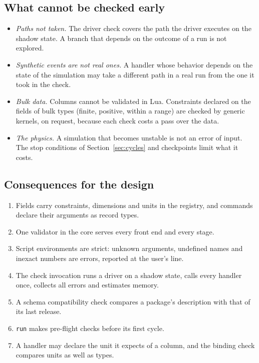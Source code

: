 \documentclass[11pt,a4paper]{article}
\newcommand{\code}[1]{\texttt{#1}}
\begin{document}
\subsection{What cannot be checked early}

\begin{itemize}
  \item \emph{Paths not taken.}  The driver check covers the path the driver
        executes on the shadow state.  A branch that depends on the outcome
        of a run is not explored.
  \item \emph{Synthetic events are not real ones.}  A handler whose
        behavior depends on the state of the simulation may take a
        different path in a real run from the one it took in the check.
  \item \emph{Bulk data.}  Columns cannot be validated in Lua.  Constraints
        declared on the fields of bulk types (finite, positive, within a
        range) are checked by generic kernels, on request, because each
        check costs a pass over the data.
  \item \emph{The physics.}  A simulation that becomes unstable is not an
        error of input.  The stop conditions of Section~\ref{sec:cycles} and
        checkpoints limit what it costs.
\end{itemize}

\subsection{Consequences for the design}

\begin{enumerate}
  \item Fields carry constraints, dimensions and units in the registry, and
        commands declare their arguments as record types.
  \item One validator in the core serves every front end and every stage.
  \item Script environments are strict: unknown arguments, undefined names
        and inexact numbers are errors, reported at the user's line.
  \item The check invocation runs a driver on a shadow state, calls every
        handler once, collects all errors and estimates memory.
  \item A schema compatibility check compares a package's description with
        that of its last release.
  \item \code{run} makes pre-flight checks before its first cycle.
  \item A handler may declare the unit it expects of a column, and the
        binding check compares units as well as types.
\end{enumerate}
\end{document}
